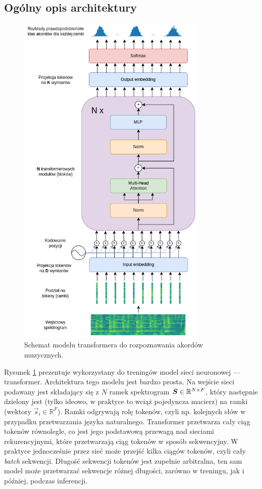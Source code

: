 \subsection{Ogólny opis architektury}

\begin{figure}
    \centering
    \includegraphics[width=0.8\textwidth]{./images/transformer.png}
    \caption{Schemat modelu transformera do rozpoznawania akordów muzycznych.}
    \label{fig:transformer}
\end{figure}

Rysunek \ref{fig:transformer} prezentuje wykorzystany do treningów model sieci neuronowej --- transformer. Architektura tego modelu jest bardzo prosta. Na wejście sieci podawany jest składający się z $N$ ramek spektrogram $\boldsymbol{S} \in \mathbb{R}^{N \times F}$, który następnie dzielony jest (tylko ideowo, w praktyce to wciąż pojedyncza macierz) na ramki (wektory $\vec s_i \in \mathbb{R}^F$). Ramki odgrywają rolę tokenów, czyli np. kolejnych słów w przypadku przetwarzania języka naturalnego. Transformer przetwarza cały ciąg tokenów równolegle, co jest jego podstawową przewagą nad sieciami rekurencyjnymi, które przetwarzają ciąg tokenów w sposób sekwencyjny. W praktyce jednocześnie przez sieć może przejść kilka ciągów tokenów, czyli cały \emph{batch} sekwencji. Długość sekwencji tokenów jest zupełnie arbitralna, ten sam model może przetwarzać sekwencje różnej długości, zarówno w treningu, jak i później, podczas inferencji.

